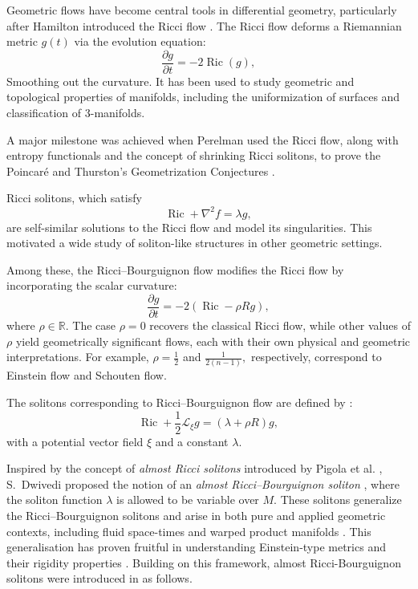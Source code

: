 \documentclass[a4paper, twoside, 10pt]{article}
\numberwithin{equation}{section}
\theoremstyle{definition}
\begin{document}
Geometric flows have become central tools in differential geometry, particularly after Hamilton introduced the Ricci flow \cite{hamilton1982}. The Ricci flow deforms a Riemannian metric $g(t)$ via the evolution equation:
\[
\frac{\partial g}{\partial t} = -2\operatorname{Ric}(g),
\]
Smoothing out the curvature. It has been used to study geometric and topological properties of manifolds, including the uniformization of surfaces and classification of 3-manifolds.

A major milestone was achieved when Perelman used the Ricci flow, along with entropy functionals and the concept of shrinking Ricci solitons, to prove the Poincar\'e and Thurston's Geometrization Conjectures \cite{perelman2002entropy, perelman2003ricci}.

Ricci solitons, which satisfy
\[
\operatorname{Ric} + \nabla^2 f = \lambda g,
\]
are self-similar solutions to the Ricci flow and model its singularities. This motivated a wide study of soliton-like structures in other geometric settings. 

Among these, the Ricci--Bourguignon flow \cite{CCD17} modifies the Ricci flow by incorporating the scalar curvature:
\[
\frac{\partial g}{\partial t} = -2(\operatorname{Ric} - \rho R g),
\]
where $\rho \in \mathbb{R}$.
The case $\rho=0$ recovers the classical Ricci flow, while other values of $\rho$ yield geometrically significant flows, each with their own physical and geometric interpretations.
For example, $\rho = \frac{1}{2}$ and $\frac{1}{2(n-1)},$ respectively, correspond to Einstein flow and Schouten flow.


The solitons corresponding to Ricci--Bourguignon flow are defined by :
\[
\operatorname{Ric} + \frac{1}{2}\mathcal{L}_\xi g = (\lambda + \rho R)g,
\]
with a potential vector field $\xi$ and a constant $\lambda$.

Inspired by the concept of \emph{almost Ricci solitons} introduced by Pigola et al. \cite{pigola2011ricci}, S.~Dwivedi proposed the notion of an \emph{almost Ricci--Bourguignon soliton} \cite{SDRBS}, where the soliton function $\lambda$ is allowed to be variable over $M$. These solitons generalize the Ricci--Bourguignon solitons and arise in both pure and applied geometric contexts, including fluid space-times \cite{chaudhary2025gradient} and warped product manifolds \cite{feitosa2019gradient}.
This generalisation has proven fruitful in understanding Einstein-type metrics and their rigidity properties \cite{BBR}.
Building on this framework, almost Ricci-Bourguignon solitons were introduced  in \cite{SDRBS} as follows.
\end{document}
